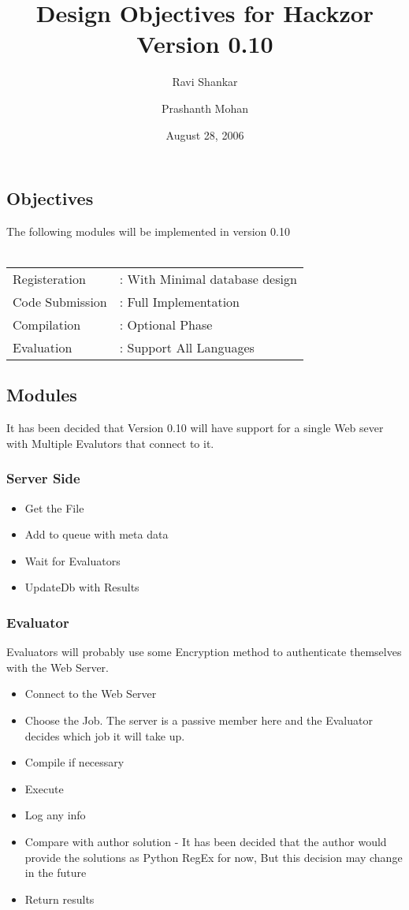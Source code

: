 \documentclass [12pt] {article}
\title{Design Objectives for Hackzor Version 0.10}
\date{August 28, 2006}
\author{Ravi Shankar \and Prashanth Mohan}
\begin{document}
\maketitle
	\subsection{Objectives}
	The following modules will be implemented in version 0.10 \\\\
	\begin{tabular}{ll}
		Registeration		&: With Minimal database design\\
		Code Submission		&: Full Implementation\\
		Compilation 		&: Optional Phase\\
		Evaluation 		&: Support All Languages\\
	\end{tabular}
	\subsection{Modules}
		It has been decided that Version 0.10 will have support for a single Web sever with Multiple Evalutors that connect to it.\\
	\subsubsection{Server Side}
		\begin{itemize}
			\item Get the File
			\item Add to queue with meta data
			\item Wait for Evaluators
			\item UpdateDb with Results
		\end{itemize}
	\subsubsection{Evaluator}
		Evaluators will probably use some Encryption method to authenticate themselves with the Web Server.\\
		\begin{itemize}
			\item Connect to the Web Server
			\item Choose the Job. The server is a passive member here and the Evaluator decides which job it will take up.
			\item Compile if necessary
			\item Execute
			\item Log any info
			\item Compare with author solution - It has been decided that the author would provide the solutions as Python RegEx for now, But this decision may change in the future
			\item Return results
		\end{itemize}
	
\end{document}
